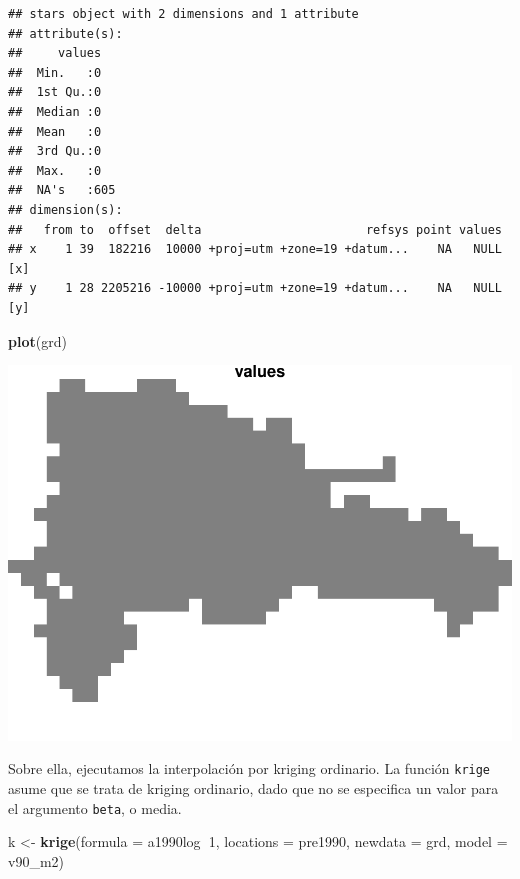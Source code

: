 \documentclass[11pt,]{article}
\newenvironment{Shaded}{\begin{snugshade}}{\end{snugshade}}
\newcommand{\KeywordTok}[1]{\textcolor[rgb]{0.13,0.29,0.53}{\textbf{#1}}}
\newcommand{\DataTypeTok}[1]{\textcolor[rgb]{0.13,0.29,0.53}{#1}}
\newcommand{\DecValTok}[1]{\textcolor[rgb]{0.00,0.00,0.81}{#1}}
\newcommand{\StringTok}[1]{\textcolor[rgb]{0.31,0.60,0.02}{#1}}
\newcommand{\OperatorTok}[1]{\textcolor[rgb]{0.81,0.36,0.00}{\textbf{#1}}}
\newcommand{\NormalTok}[1]{#1}
\begin{document}
\begin{verbatim}
## stars object with 2 dimensions and 1 attribute
## attribute(s):
##     values    
##  Min.   :0    
##  1st Qu.:0    
##  Median :0    
##  Mean   :0    
##  3rd Qu.:0    
##  Max.   :0    
##  NA's   :605  
## dimension(s):
##   from to  offset  delta                       refsys point values    
## x    1 39  182216  10000 +proj=utm +zone=19 +datum...    NA   NULL [x]
## y    1 28 2205216 -10000 +proj=utm +zone=19 +datum...    NA   NULL [y]
\end{verbatim}

\begin{Shaded}
\begin{Highlighting}[]
\KeywordTok{plot}\NormalTok{(grd)}
\end{Highlighting}
\end{Shaded}

\includegraphics[width=800px]{Proyecto-Precipitaciones_files/figure-latex/grd-1}

Sobre ella, ejecutamos la interpolación por kriging ordinario. La
función \texttt{krige} asume que se trata de kriging ordinario, dado que
no se especifica un valor para el argumento \texttt{beta}, o media.

\begin{Shaded}
\begin{Highlighting}[]
\NormalTok{k <-}\StringTok{ }\KeywordTok{krige}\NormalTok{(}\DataTypeTok{formula =}\NormalTok{ a1990log}\OperatorTok{~}\DecValTok{1}\NormalTok{, }\DataTypeTok{locations =}\NormalTok{ pre1990, }\DataTypeTok{newdata =}\NormalTok{ grd, }\DataTypeTok{model =}\NormalTok{ v90_m2)}
\end{Highlighting}
\end{Shaded}
\end{document}
